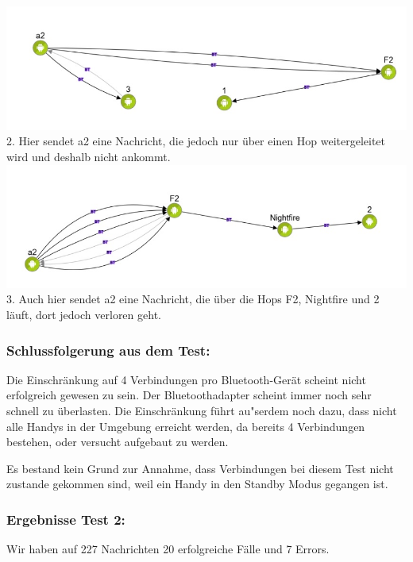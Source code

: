 \includegraphics[width=1.0\textwidth]{belege/grosstests/Bilder/Grosstest2/Test1Misserfolg1.jpg}
2. Hier sendet a2 eine Nachricht, die jedoch nur über einen Hop
weitergeleitet wird und deshalb nicht ankommt.
\includegraphics[width=1.0\textwidth]{belege/grosstests/Bilder/Grosstest2/Test1Misserfolg3.jpg}
3. Auch hier sendet a2 eine Nachricht, die über die Hops F2, Nightfire und
2 läuft, dort jedoch verloren geht.

\subsubsection{Schlussfolgerung aus dem
Test:}\label{schlussfolgerung-aus-dem-test-2}

Die Einschränkung auf 4 Verbindungen pro Bluetooth-Gerät scheint nicht
erfolgreich gewesen zu sein. Der Bluetoothadapter scheint immer noch
sehr schnell zu überlasten. Die Einschränkung führt au"serdem noch dazu,
dass nicht alle Handys in der Umgebung erreicht werden, da bereits 4
Verbindungen bestehen, oder versucht aufgebaut zu werden.

Es bestand kein Grund zur Annahme, dass Verbindungen bei diesem Test
nicht zustande gekommen sind, weil ein Handy in den Standby Modus
gegangen ist.

\subsubsection{Ergebnisse Test 2:}\label{ergebnisse-test-2-1}

Wir haben auf 227 Nachrichten 20 erfolgreiche Fälle und 7 Errors.

